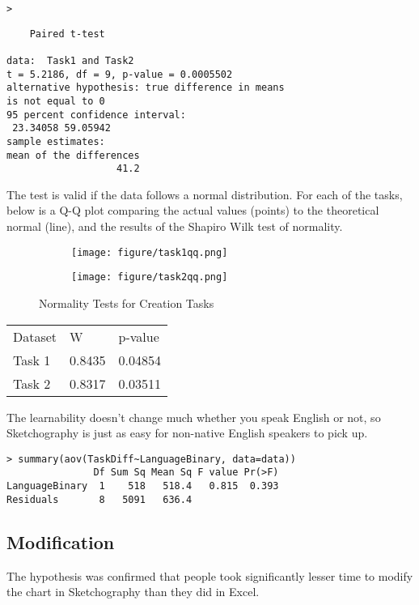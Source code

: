 \begin{alltt}
>   \hlstd{=} \hlstd{)}
\end{alltt}
\begin{verbatim} 
	Paired t-test

data:  Task1 and Task2
t = 5.2186, df = 9, p-value = 0.0005502
alternative hypothesis: true difference in means 
is not equal to 0
95 percent confidence interval:
 23.34058 59.05942
sample estimates:
mean of the differences 
                   41.2 
\end{verbatim}

The test is valid if the data follows a normal distribution. For each of the tasks, below is a Q-Q plot comparing the actual values (points) to the theoretical normal (line), and the results of the Shapiro Wilk test of normality.

\begin{figure}[H]
		\centering
		\begin{subfigure}[b]{\textwidth}
			\texttt{[image: figure/task1qq.png]}
		\end{subfigure}
		\begin{subfigure}[b]{\textwidth}
			\texttt{[image: figure/task2qq.png]}
		\end{subfigure}
		\caption{Normality Tests for Creation Tasks}
	\end{figure}

\begin{tabular}{l l l}
Dataset & W & p-value \\
Task 1 & 0.8435 & 0.04854 \\
Task 2 & 0.8317 & 0.03511 \\
\end{tabular}

The learnability doesn't change much whether you speak English or not, so Sketchography is just as easy for non-native English speakers to pick up.
\begin{verbatim}
> summary(aov(TaskDiff~LanguageBinary, data=data))
               Df Sum Sq Mean Sq F value Pr(>F)
LanguageBinary  1    518   518.4   0.815  0.393
Residuals       8   5091   636.4                       
\end{verbatim}

\subsection{Modification}
The hypothesis was confirmed that people took significantly lesser time to modify the chart in Sketchography than they did in Excel.

